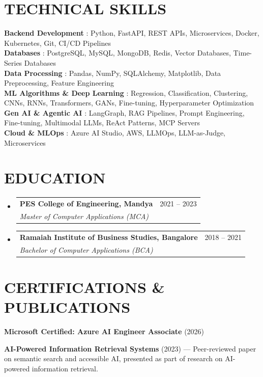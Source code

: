 \documentclass[letterpaper,10pt]{article}
\makeatletter
\newcommand{\myuline}[1]{%
  \uline{\phantom{#1}}%
  \llap{\contour{white}{#1}}%
}
\newcommand{\resumeSubheading}[4]{
  \vspace{-2pt}\item 
    \begin{tabular*}{\textwidth}[t]{l@{\extracolsep{\fill}}r}
      \textbf{#1} & {\color{dark-grey}\small #2}\vspace{1pt}\\ 
      \textit{#3} & {\color{dark-grey} \small #4}\\ 
    \end{tabular*}\vspace{-6pt} 
}
\newcommand{\resumeSubHeadingListStart}{\begin{itemize}[leftmargin=0in, label={}]}
\newcommand{\resumeSubHeadingListEnd}{\end{itemize}\vspace{-6pt}}
\makeatother
\begin{document}
\section{TECHNICAL SKILLS}
 \begin{itemize}[leftmargin=0in, label={}]
    \small{\item{
     \textbf{Backend Development} {: Python, FastAPI, REST APIs, Microservices, Docker, Kubernetes, Git, CI/CD Pipelines}\vspace{2pt} \\
     \textbf{Databases} {: PostgreSQL, MySQL, MongoDB, Redis, Vector Databases, Time-Series Databases}\vspace{2pt} \\
     \textbf{Data Processing} {: Pandas, NumPy, SQLAlchemy, Matplotlib, Data Preprocessing, Feature Engineering}\vspace{2pt} \\
     \textbf{ML Algorithms \& Deep Learning} {: Regression, Classification, Clustering, CNNs, RNNs, Transformers, GANs, Fine-tuning, Hyperparameter Optimization}\vspace{2pt} \\
     \textbf{Gen AI \& Agentic AI} {: LangGraph, RAG Pipelines, Prompt Engineering, Fine-tuning, Multimodal LLMs, ReAct Patterns, MCP Servers}\vspace{2pt} \\
     \textbf{Cloud \& MLOps} {: Azure AI Studio, AWS, LLMOps, LLM-as-Judge, Microservices}
    }}
 \end{itemize}
\section {EDUCATION}
  \resumeSubHeadingListStart
    \resumeSubheading
      {PES College of Engineering, Mandya}{2021 -- 2023}
      {Master of Computer Applications (MCA)}{}
    \resumeSubheading
      {Ramaiah Institute of Business Studies, Bangalore}{2018 -- 2021}
      {Bachelor of Computer Applications (BCA)}{}
  \resumeSubHeadingListEnd

\section{CERTIFICATIONS \& PUBLICATIONS}
 \begin{itemize}[leftmargin=0in, label={}]
    \small{
        \item[] \textbf{Microsoft Certified: Azure AI Engineer Associate} (2026) \vspace{-2pt}
        \item[] \textbf{AI-Powered Information Retrieval Systems} (2023) — Peer-reviewed paper on semantic search and accessible AI, presented as part of research on AI-powered information retrieval. \href{https://rjpn.org/ijcspub/viewpaperforall.php?paper=IJCSP23B1477}{\myuline{[Link]}}
    }
 \end{itemize}

\end{document}
